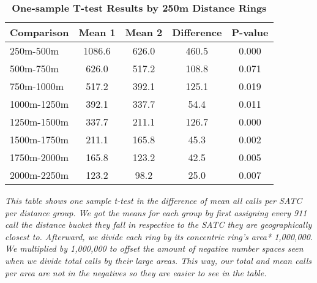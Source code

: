 \begin{table}[htbp]
\centering
\begin{tabular}{l|c c c c}
\hline
Comparison & Mean 1 & Mean 2 & Difference & P-value \\
\hline
250m-500m & 1086.6 & 626.0 & 460.5 & 0.000 \\
500m-750m & 626.0 & 517.2 & 108.8 & 0.071 \\
750m-1000m & 517.2 & 392.1 & 125.1 & 0.019 \\
1000m-1250m & 392.1 & 337.7 & 54.4 & 0.011 \\
1250m-1500m & 337.7 & 211.1 & 126.7 & 0.000 \\
1500m-1750m & 211.1 & 165.8 & 45.3 & 0.002 \\
1750m-2000m & 165.8 & 123.2 & 42.5 & 0.005 \\
2000m-2250m & 123.2 & 98.2 & 25.0 & 0.007 \\
\hline
\end{tabular}
\caption{\textbf{One-sample T-test Results by 250m Distance Rings}}
\label{tab:ttests1}
\centering\textit{This table shows one sample t-test in the difference of mean all calls per SATC per distance group. We got the means for each group by first assigning every 911 call the distance bucket they fall in respective to the SATC they are geographically closest to. Afterward, we divide each ring by its concentric ring's area* 1,000,000. We multiplied by 1,000,000 to offset the amount of negative number spaces seen when we divide total calls by their large areas. This way, our total and mean calls per area are not in the negatives so they are easier to see in the table. }
\end{table}
